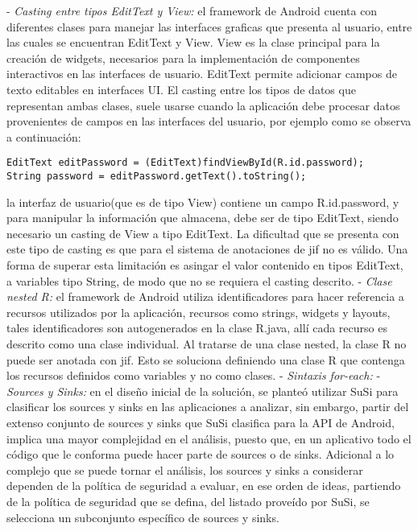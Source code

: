 - \textit{Casting entre tipos EditText y View:}\newline
el framework de Android cuenta con diferentes clases para manejar las interfaces
graficas que presenta al usuario, entre las cuales se encuentran EditText y
View. View es la clase principal para la creación de widgets, necesarios para la
implementación de componentes interactivos en las interfaces de usuario.
EditText permite adicionar campos de texto editables en interfaces UI. El
casting entre los tipos de datos que representan ambas clases, suele usarse
cuando la aplicación debe procesar datos provenientes de campos en las
interfaces del usuario, por ejemplo como se observa a continuación:
\begin{lstlisting}
EditText editPassword = (EditText)findViewById(R.id.password);
String password = editPassword.getText().toString();
\end{lstlisting}
la interfaz de usuario(que es de tipo View) contiene un campo R.id.password, y
para manipular la información que almacena, debe ser de tipo EditText, siendo
necesario un casting de View a tipo EditText. La dificultad que se presenta con
este tipo de casting es que para el sistema de anotaciones de jif no es válido.
Una forma de superar esta limitación es asingar el valor contenido en tipos
EditText, a variables tipo String, de modo que no se requiera el casting
descrito.\newline
- \textit{Clase nested R:}\newline
el framework de Android utiliza identificadores para hacer referencia a recursos
utilizados por la aplicación, recursos como strings, widgets y layouts, tales
identificadores son autogenerados en la clase R.java, allí cada recurso es
descrito como una clase individual. Al tratarse de una clase nested, la clase R
no puede ser anotada con jif. Esto se soluciona definiendo una clase R que
contenga los recursos definidos como variables y no como clases.\newline
- \textit{Sintaxis for-each:}\newline 
- \textit{Sources y Sinks:}\newline
en el diseño inicial de la solución, se
planteó utilizar SuSi para clasificar los sources y sinks en las aplicaciones a analizar, sin embargo,
partir del extenso conjunto de sources y sinks que SuSi clasifica para la API de
Android, implica una mayor complejidad en el análisis, puesto que, en un
aplicativo todo el código que le conforma puede hacer parte de sources o de
sinks. Adicional a lo complejo que se puede tornar el análisis, los sources y
sinks a considerar dependen de la política de seguridad a evaluar, en ese orden
de ideas, partiendo de la política de seguridad que se defina, del listado
proveído por SuSi, se selecciona un subconjunto específico de sources y sinks.


